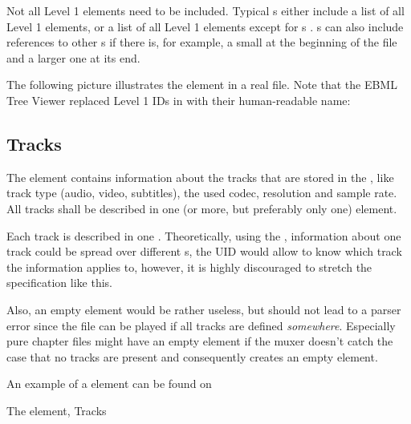 \documentclass[12pt]{article}
\begin{document}
Not all Level 1 elements need to be included. Typical s either include a list of all Level 1 elements, or a list of all Level 1 elements except for s . s can also include references to other s if there is, for example, a small  at the beginning of the file and a larger one at its end.

The following picture illustrates the  element in a real file. Note that the EBML Tree Viewer replaced Level 1 IDs in  with their human-readable name:


\newpage
\subsection{Tracks}
The  element contains information about the tracks that are stored in the , like track type (audio, video, subtitles), the used codec, resolution and sample rate. All tracks shall be described in one (or more, but preferably only one)  element. 

Each track is described in one . Theoretically, using the , information about one track could be spread over different s, the UID would allow to know which track the information applies to, however, it is highly discouraged to stretch the specification like this.

Also, an empty  element would be rather useless, but should not lead to a parser error since the file can be played if all tracks are defined \emph{somewhere}. Especially pure chapter files might have an empty  element if the muxer doesn't catch the case that no tracks are present and consequently creates an empty  element.

An example of a  element can be found on 

\begin{elementdescription}{The  element, }{Tracks}
\end{elementdescription}
\end{document}
